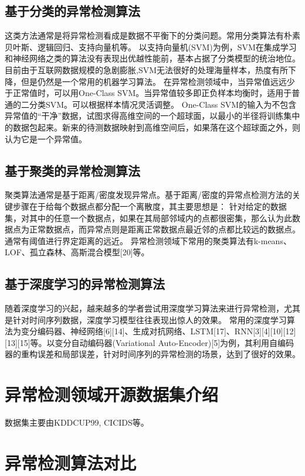 \subsection{基于分类的异常检测算法}
这类方法通常是将异常检测看成是数据不平衡下的分类问题。常用分类算法有朴素贝叶斯、逻辑回归、支持向量机等。
以支持向量机(SVM)为例，SVM在集成学习和神经网络之类的算法没有表现出优越性能前，基本占据了分类模型的统治地位。
目前由于互联网数据规模的急剧膨胀,SVM无法很好的处理海量样本，热度有所下降，但是仍然是一个常用的机器学习算法。
在异常检测领域中，当异常值远远少于正常值时，可以用One-Class SVM。当异常值较多即正负样本均衡时，适用于普通的二分类SVM。可以根据样本情况灵活调整。
One-Class SVM的输入为不包含异常值的“干净”数据，试图求得高维空间的一个超球面，以最小的半径将训练集中的数据包起来。新来的待测数据映射到高维空间后，如果落在这个超球面之外，则认为它是一个异常值。

\subsection{基于聚类的异常检测算法}

聚类算法通常是基于距离/密度发现异常点。基于距离/密度的异常点检测方法的关键步骤在于给每个数据点都分配一个离散度，其主要思想是：
针对给定的数据集，对其中的任意一个数据点，如果在其局部邻域内的点都很密集，那么认为此数据点为正常数据点，而异常点则是距离正常数据点最近邻的点都比较远的数据点。通常有阈值进行界定距离的远近。
异常检测领域下常用的聚类算法有k-means、LOF、孤立森林、高斯混合模型[20]等。

\subsection{基于深度学习的异常检测算法}
随着深度学习的兴起，越来越多的学者尝试用深度学习算法来进行异常检测，尤其是针对时间序列数据，深度学习模型往往表现出惊人的效果。
常用的深度学习算法为变分编码器、神经网络[6][14]、生成对抗网络、LSTM[17]、RNN[3][4][10][12][13][15]等。以变分自动编码器(Variational Auto-Encoder)[5]为例，其利用自编码器的重构误差和局部误差，针对时间序列的异常检测的场景，达到了很好的效果。

\section{异常检测领域开源数据集介绍}
数据集主要由KDDCUP99, CICIDS等。
\section{异常检测算法对比}